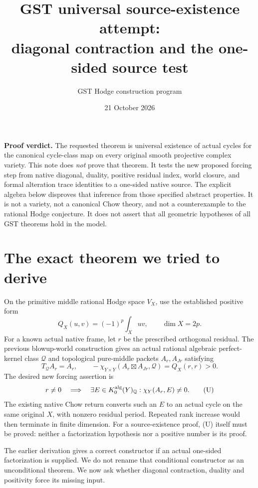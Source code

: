 \documentclass[11pt]{article}
\title{GST universal source-existence attempt:\\
diagonal contraction and the one-sided source test}
\author{GST Hodge construction program}
\date{21 October 2026}
\newcommand{\Q}{\mathbb Q}
\begin{document}
\maketitle

\noindent\textbf{Proof verdict.}
The requested theorem is universal existence of actual cycles for the
canonical cycle-class map on every original smooth projective complex
variety. This note does \emph{not} prove that theorem.
It tests the new proposed forcing step from native diagonal,
duality, positive residual index, world closure, and formal alteration
trace identities to a one-sided native source. The explicit algebra
below disproves that inference from those specified abstract properties.
It is not a variety, not a canonical Chow theory, and not a counterexample
to the rational Hodge conjecture. It does not assert that all geometric
hypotheses of all GST theorems hold in the model.

\section{The exact theorem we tried to derive}
On the primitive middle rational Hodge space \(V_X\), use the established
positive form
\[
 Q_X(u,v)=(-1)^p\int_X uv,\qquad \dim X=2p.
\]
For a known actual native frame, let \(r\) be the prescribed orthogonal
residual. The previous blowup-world construction gives an actual
rational algebraic perfect-kernel class \(\mathscr Q\) and topological
pure-middle packets \(A_r,A_{Jr}\) satisfying
\[
 T_{\mathscr Q}A_r=A_r,\qquad
 -\chi_{Y\times Y}(A_r\boxtimes A_{Jr},\mathscr Q)=Q_X(r,r)>0.
 \tag{1}
\]
The desired new forcing assertion is
\[
 r\ne0\quad\Longrightarrow\quad
 \exists E\in K_0^{\rm alg}(Y)_{\Q}:
             \chi_Y(A_r,E)\ne0.                              \tag{U}
\]
The existing native Chow return converts such an \(E\) to an actual
cycle on the same original \(X\), with nonzero residual period.
Repeated rank increase would then terminate in finite dimension.
For a source-existence proof, (U) itself must be proved:
neither a factorization hypothesis nor a positive number is its proof.

The earlier derivation gives a correct constructor if an actual
one-sided factorization is supplied. We do not rename that conditional
constructor as an unconditional theorem. We now ask whether diagonal
contraction, duality and positivity force its missing input.
\end{document}

